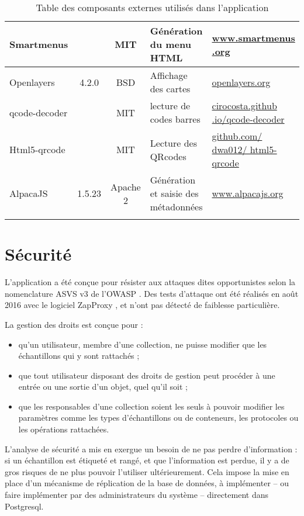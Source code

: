 \begin{longtable}{|>{\raggedright\arraybackslash}p{3cm}|c|c|>{\raggedright\arraybackslash}p{3cm}|>{\raggedright\arraybackslash}p{3cm}|}
\hline 
Smartmenus &  & MIT & Génération du menu HTML & \href{http://www.smartmenus .org}{www.smartmenus .org} \\ 
\hline 
Openlayers & 4.2.0 & BSD & Affichage des cartes & \href{http://openlayers.org/}{openlayers.org} \\ 
\hline 
qcode-decoder & & MIT & lecture de codes barres & \href{http://cirocosta.github.io/qcode-decoder/}{cirocosta.github .io/qcode-decoder}\\
\hline
Html5-qrcode &  & MIT & Lecture des QRcodes &  \href{https://github.com/dwa012/html5-qrcode}{github.com/ dwa012/ html5-qrcode} \\ 
\hline 
AlpacaJS & 1.5.23 & Apache 2 & Génération et saisie des métadonnées & 
\href{http://www.alpacajs.org/}{www.alpacajs.org}\\
\hline
\caption{Table des composants externes utilisés dans l'application}
\end{longtable} 

\section{Sécurité}

L'application a été conçue pour résister aux attaques dites opportunistes selon la nomenclature ASVS v3 \cite{asvs} de l'OWASP \cite{owasp}. Des tests d'attaque ont été réalisés en août 2016 avec le logiciel ZapProxy \cite{zaproxy}, et n'ont pas détecté de faiblesse particulière.

La gestion des droits est conçue pour :
\begin{itemize}
\item qu'un utilisateur, membre d'une collection, ne puisse modifier que les échantillons qui y sont rattachés ;
\item que tout utilisateur disposant des droits de gestion peut procéder à une entrée ou une sortie d'un objet, quel qu'il soit ;
\item que les responsables d'une collection soient les seuls à pouvoir modifier les paramètres comme les types d'échantillons ou de conteneurs, les protocoles ou les opérations rattachées.
\end{itemize}
L'analyse de sécurité a mis en exergue un besoin de ne pas perdre d'information : si un échantillon est étiqueté et rangé, et que l'information est perdue, il y a de gros risques de ne plus pouvoir l'utiliser ultérieurement. Cela impose la mise en place d'un mécanisme de réplication de la base de données, à implémenter -- ou faire implémenter par des administrateurs du système -- directement dans Postgresql.


